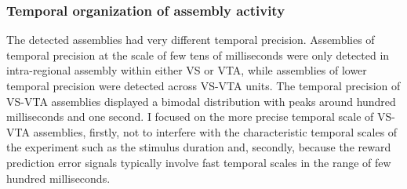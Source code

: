 \subsubsection{Temporal organization of assembly activity}  
The detected assemblies had very different temporal precision. Assemblies of temporal precision at the scale of few tens of milliseconds were only detected in intra-regional assembly within either VS or VTA, while assemblies of lower temporal precision were detected across VS-VTA units. The temporal precision of VS-VTA assemblies displayed a bimodal distribution with peaks around hundred milliseconds and one second. I focused on the more precise temporal scale of VS-VTA assemblies, firstly, not to interfere with the characteristic temporal scales of the experiment such as the stimulus duration and, secondly, because the reward prediction error signals typically involve fast temporal scales in the range of few hundred milliseconds.\\\\
